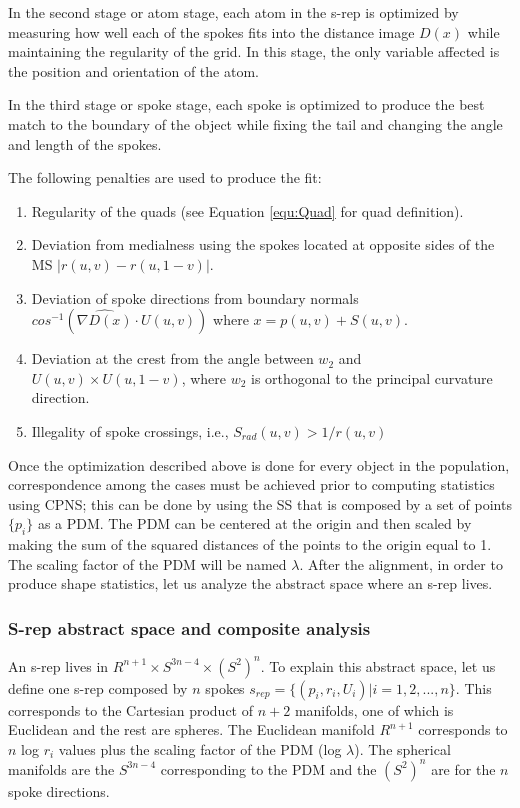 In the second stage or atom stage, each atom in the s-rep is optimized
by measuring how well each of the spokes fits into the distance image $D(x)$ while maintaining 
the regularity of the grid. In this stage, the only variable affected is the position and orientation of the atom. 

In the third stage or spoke stage, each spoke is optimized to produce the best match to the boundary of the object
while fixing the tail and changing the angle and length of the spokes.

The following penalties are used to produce the fit:
\begin{enumerate}
 \item Regularity of the quads (see Equation \ref{equ:Quad} for quad definition). 
 \item Deviation from medialness using the spokes located at opposite sides of the MS $|r(u, v) - r(u, 1 - v)|$. 
 \item Deviation of spoke directions from boundary normals $cos^{-1}(\hat{\nabla D(x)} \cdot U(u, v))$ where $x = p(u,v) + S(u, v)$.
 \item Deviation at the crest from the angle between $w_2$ and $U(u, v) \times U(u, 1 - v)$, where $w_2$ is orthogonal to the principal curvature direction.
 \item Illegality of spoke crossings, i.e.,  $S_{rad}(u, v) > 1/r(u,v)$ 
\end{enumerate}

Once the optimization described above is done for every object in the population, 
correspondence among the cases must be achieved prior to computing 
statistics using CPNS; this can be done by using the SS that is composed by 
a set of points $\{p_i\}$ as a PDM. The PDM can be centered at the origin and 
then scaled by making the 
sum of the squared distances of the points to the origin equal to 1.
The scaling factor of the PDM will be named $\lambda$.
After the alignment, in order to produce shape statistics, let us analyze the 
abstract space where an s-rep lives.

\subsubsection{S-rep abstract space and composite analysis}

An s-rep lives in $R^{n+1} \times S^{3n - 4} \times (S^2)^n$.
To explain this abstract space, let us
define one s-rep composed by $n$ spokes $s_{rep} = \{(p_i, r_i, U_i) | i = 1,2, ...,n\}$.
This corresponds to the Cartesian product of $n + 2$ manifolds, 
one of which is Euclidean and the rest are spheres.
The Euclidean manifold $R^{n+1}$ corresponds to $n$ log $r_i$ values plus 
the scaling factor of the PDM (log $\lambda$).
The spherical manifolds are the $S^{3n - 4}$ corresponding to the PDM
and the $(S^2)^n$ are for the $n$ spoke directions.

